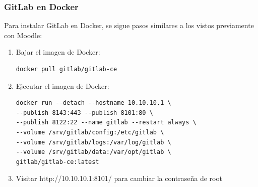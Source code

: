 \subsubsection{GitLab en Docker}
Para instalar GitLab en Docker\citep{GitLab-Docker-Images}, se sigue pasos similares a los vistos previamente con Moodle:
\begin{enumerate}
	\item Bajar el imagen de Docker:
    \begin{lstlisting}    
docker pull gitlab/gitlab-ce
    \end{lstlisting}
    \item Ejecutar el imagen de Docker:
    \begin{lstlisting}    
docker run --detach --hostname 10.10.10.1 \
--publish 8143:443 --publish 8101:80 \
--publish 8122:22 --name gitlab --restart always \
--volume /srv/gitlab/config:/etc/gitlab \
--volume /srv/gitlab/logs:/var/log/gitlab \
--volume /srv/gitlab/data:/var/opt/gitlab \
gitlab/gitlab-ce:latest
    \end{lstlisting}
    \item Visitar http://10.10.10.1:8101/ para cambiar la contraseña de root
\end{enumerate}

